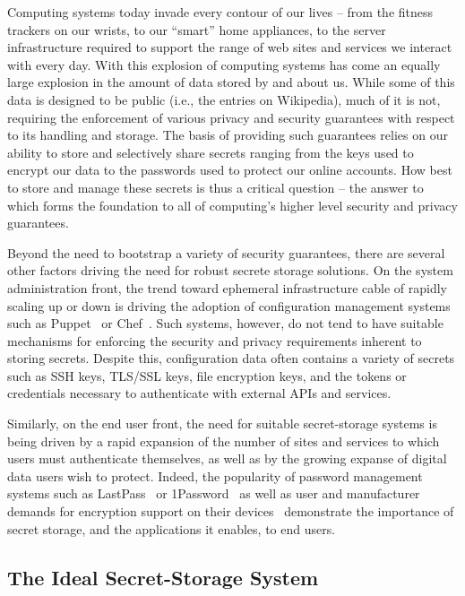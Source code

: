 Computing systems today invade every contour of our lives -- from the
fitness trackers on our wrists, to our ``smart'' home appliances, to
the server infrastructure required to support the range of web sites
and services we interact with every day. With this explosion of
computing systems has come an equally large explosion in the amount of
data stored by and about us. While some of this data is designed to be
public (i.e., the entries on Wikipedia), much of it is not, requiring
the enforcement of various privacy and security guarantees with
respect to its handling and storage. The basis of providing such
guarantees relies on our ability to store and selectively share
secrets ranging from the keys used to encrypt our data to the
passwords used to protect our online accounts. How best to store and
manage these secrets is thus a critical question -- the answer to
which forms the foundation to all of computing's higher level security
and privacy guarantees.

Beyond the need to bootstrap a variety of security guarantees, there
are several other factors driving the need for robust secrete storage
solutions. On the system administration front, the trend toward
ephemeral infrastructure cable of rapidly scaling up or down is
driving the adoption of configuration management systems such as
Puppet~\cite{puppet} or Chef~\cite{chef}. Such systems, however, do
not tend to have suitable mechanisms for enforcing the security and
privacy requirements inherent to storing secrets. Despite this,
configuration data often contains a variety of secrets such as SSH
keys, TLS/SSL keys, file encryption keys, and the tokens or
credentials necessary to authenticate with external APIs and services.

Similarly, on the end user front, the need for suitable secret-storage
systems is being driven by a rapid expansion of the number of sites
and services to which users must authenticate themselves, as well as
by the growing expanse of digital data users wish to protect. Indeed,
the popularity of password management systems such as
LastPass~\cite{lastpass} or 1Password~\cite{onepassword} as well as
user and manufacturer demands for encryption support on their
devices~\cite{apple-fbiletter} demonstrate the importance of secret
storage, and the applications it enables, to end users.

\subsection{The Ideal Secret-Storage System}

